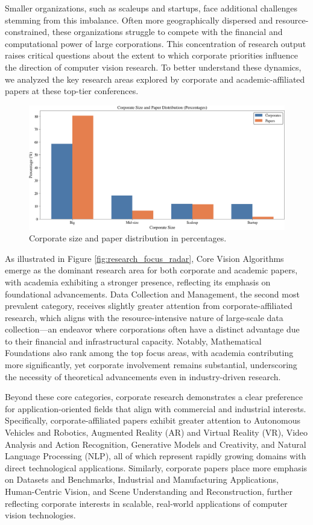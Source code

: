 \documentclass{article}
\begin{document}
Smaller organizations, such as scaleups and startups, face additional challenges stemming from this imbalance. Often more geographically dispersed and resource-constrained, these organizations struggle to compete with the financial and computational power of large corporations. This concentration of research output raises critical questions about the extent to which corporate priorities influence the direction of computer vision research. To better understand these dynamics, we analyzed the key research areas explored by corporate and academic-affiliated papers at these top-tier conferences. 


\begin{figure}[ht]
  \centering
  \includegraphics[width=\textwidth]{report/images/corporate_paper_distribution.png}  
  \caption{Corporate size and paper distribution in percentages.}
  \label{fig:corporate_size_graph}
\end{figure}

As illustrated in Figure \ref{fig:research_focus_radar}, Core Vision Algorithms emerge as the dominant research area for both corporate and academic papers, with academia exhibiting a stronger presence, reflecting its emphasis on foundational advancements. Data Collection and Management, the second most prevalent category, receives slightly greater attention from corporate-affiliated research, which aligns with the resource-intensive nature of large-scale data collection—an endeavor where corporations often have a distinct advantage due to their financial and infrastructural capacity. Notably, Mathematical Foundations also rank among the top focus areas, with academia contributing more significantly, yet corporate involvement remains substantial, underscoring the necessity of theoretical advancements even in industry-driven research.

Beyond these core categories, corporate research demonstrates a clear preference for application-oriented fields that align with commercial and industrial interests. Specifically, corporate-affiliated papers exhibit greater attention to Autonomous Vehicles and Robotics, Augmented Reality (AR) and Virtual Reality (VR), Video Analysis and Action Recognition, Generative Models and Creativity, and Natural Language Processing (NLP), all of which represent rapidly growing domains with direct technological applications. Similarly, corporate papers place more emphasis on Datasets and Benchmarks, Industrial and Manufacturing Applications, Human-Centric Vision, and Scene Understanding and Reconstruction, further reflecting corporate interests in scalable, real-world applications of computer vision technologies.
\end{document}
